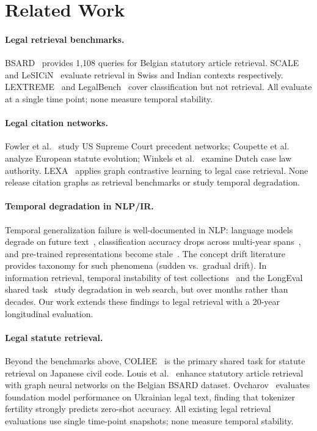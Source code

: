 \documentclass[11pt]{article}
\begin{document}
\section{Related Work}
\label{sec:related}

\paragraph{Legal retrieval benchmarks.}
BSARD~\citep{lotfi2024bsard} provides 1{,}108 queries for Belgian statutory article retrieval.
SCALE~\citep{rasiah2023scale} and LeSICiN~\citep{paul2021lesicin} evaluate retrieval in Swiss and Indian contexts respectively.
LEXTREME~\citep{niklaus2023lextreme} and LegalBench~\citep{guha2023legalbench} cover classification but not retrieval.
All evaluate at a single time point; none measure temporal stability.

\paragraph{Legal citation networks.}
Fowler et al.~\citep{fowler2007network} study US Supreme Court precedent networks; Coupette et al.~\citep{coupette2021measuring} analyze European statute evolution; Winkels et al.~\citep{winkels2011determining} examine Dutch case law authority.
LEXA~\citep{tang2024casegnn} applies graph contrastive learning to legal case retrieval.
None release citation graphs as retrieval benchmarks or study temporal degradation.

\paragraph{Temporal degradation in NLP/IR.}
Temporal generalization failure is well-documented in NLP: language models degrade on future text~\citep{lazaridou2021mind}, classification accuracy drops across multi-year spans~\citep{luu2022time}, and pre-trained representations become stale~\citep{agarwal2022temporal}.
The concept drift literature~\citep{gama2014survey} provides taxonomy for such phenomena (sudden vs.\ gradual drift).
In information retrieval, temporal instability of test collections~\citep{campos2014survey} and the LongEval shared task~\citep{alkhalifa2023longeval} study degradation in web search, but over months rather than decades.
Our work extends these findings to legal retrieval with a 20-year longitudinal evaluation.

\paragraph{Legal statute retrieval.}
Beyond the benchmarks above, COLIEE~\citep{rabelo2024coliee} is the primary shared task for statute retrieval on Japanese civil code.
Louis et al.~\citep{louis2023finding} enhance statutory article retrieval with graph neural networks on the Belgian BSARD dataset.
Ovcharov~\citep{ovcharov2025tokenizer} evaluates foundation model performance on Ukrainian legal text, finding that tokenizer fertility strongly predicts zero-shot accuracy.
All existing legal retrieval evaluations use single time-point snapshots; none measure temporal stability.
\end{document}
